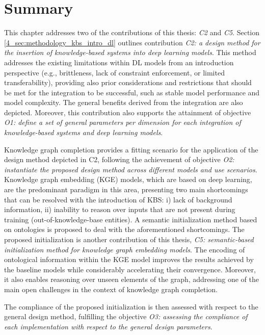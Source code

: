 \section{Summary}\label{4_sec:summary}
This chapter addresses two of the contributions of this thesis: \textit{C2} and \textit{C5}. Section \ref{4_sec:methodology_kbs_intro_dl} outlines contribution \textit{C2: a design method for the insertion of knowledge-based systems into deep learning models}. This method addresses the existing limitations within DL models from an introduction perspective (e.g., brittleness, lack of constraint enforcement, or limited transferability), providing also prior considerations and restrictions that should be met for the integration to be successful, such as stable model performance and model complexity. The general benefits derived from the integration are also depicted. Moreover, this contribution also supports the attainment of objective \textit{O1: define a set of general parameters per dimension for each integration of knowledge-based systems and deep learning models}. 

Knowledge graph completion provides a fitting scenario for the application of the design method depicted in C2, following the achievement of objective \textit{O2: instantiate the proposed design method across different models and use scenarios}. Knowledge graph embedding (KGE) models, which are based on deep learning, are the predominant paradigm in this area, presenting two main shortcomings that can be resolved with the introduction of KBS: i) lack of background information, ii) inability to reason over inputs that are not present during training (out-of-knowledge-base entities). A semantic initialization method based on ontologies is proposed to deal with the aforementioned shortcomings. The proposed initialization is another contribution of this thesis, \textit{C5: semantic-based initialization method for knowledge graph embedding models}. The encoding of ontological information within the KGE model improves the results achieved by the baseline models while considerably accelerating their convergence. Moreover, it also enables reasoning over unseen elements of the graph, addressing one of the main open challenges in the context of knowledge graph completion. 

The compliance of the proposed initialization is then assessed with respect to the general design method, fulfilling the objective \textit{O3: assessing the compliance of each implementation with respect to the general design parameters}. 